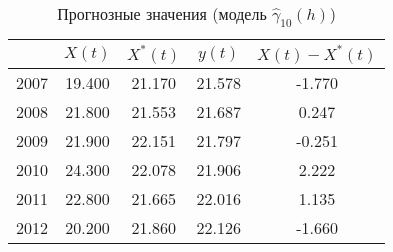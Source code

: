 \begin{table}[ht]
\centering
\begin{tabular}{r|cccc}
  \hline
 & $X(t)$ & $X^{*}(t)$ & $y(t)$ & $ X(t) - X^{*}(t) $ \\ 
  \hline
2007 & 19.400 & 21.170 & 21.578 & -1.770 \\ 
  2008 & 21.800 & 21.553 & 21.687 & 0.247 \\ 
  2009 & 21.900 & 22.151 & 21.797 & -0.251 \\ 
  2010 & 24.300 & 22.078 & 21.906 & 2.222 \\ 
  2011 & 22.800 & 21.665 & 22.016 & 1.135 \\ 
  2012 & 20.200 & 21.860 & 22.126 & -1.660 \\ 
   \hline
\end{tabular}
\caption{Прогнозные значения (модель $ \widehat{\gamma}_{10}(h) $)} 
\label{table:auto-class-18-prediction}
\end{table}

